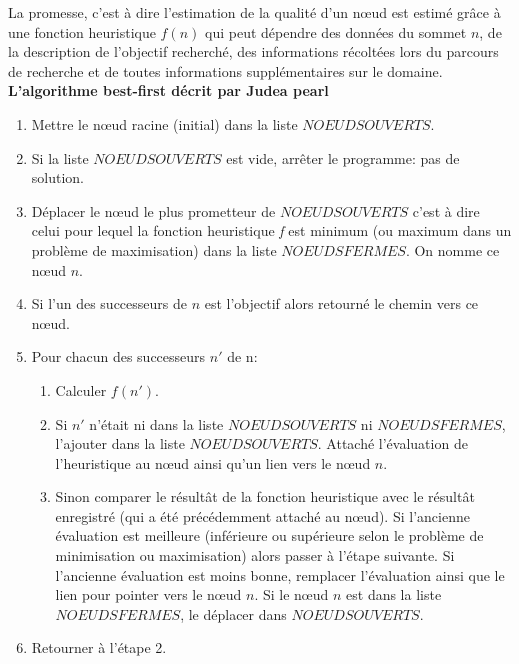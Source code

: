 La promesse, c'est à dire l'estimation de la qualité d'un nœud est estimé grâce à une fonction heuristique $f(n)$ qui peut dépendre des données du sommet $n$, de la description de l'objectif recherché, des informations récoltées lors du parcours de recherche et de toutes informations supplémentaires sur le domaine.\\




\textbf{L'algorithme best-first décrit par Judea pearl\cite{judea-pearl-heuristics}}
\begin{enumerate}
\item Mettre le nœud racine (initial) dans la liste $NOEUDS OUVERTS$.
\item Si la liste $NOEUDS OUVERTS$ est vide, arrêter le programme: pas de solution.
\item Déplacer le nœud le plus prometteur de $NOEUDS OUVERTS$ c'est à dire celui pour lequel la fonction heuristique \textit{f} est minimum (ou maximum dans un problème de maximisation) dans la liste $NOEUDS FERMES$. On nomme ce nœud $n$.
\item Si l'un des successeurs de $n$ est l'objectif alors retourné le chemin vers ce nœud.
\item Pour chacun des successeurs $n'$ de n:
    \begin{enumerate}
    \item Calculer $f(n')$.
    \item Si $n'$ n'était ni dans la liste $NOEUDS OUVERTS$ ni $NOEUDS FERMES$, l'ajouter dans la liste $NOEUDS OUVERTS$. Attaché l'évaluation de l'heuristique au nœud ainsi qu'un lien vers le nœud $n$.
    \item Sinon comparer le résultât de la fonction heuristique avec le résultât enregistré (qui a été précédemment attaché au nœud). Si l'ancienne évaluation est meilleure (inférieure ou supérieure selon le problème de minimisation ou maximisation) alors passer à l'étape suivante. Si l'ancienne évaluation est moins bonne, remplacer l'évaluation ainsi que le lien  pour pointer vers le nœud $n$. Si le nœud $n$ est dans la liste $NOEUDS FERMES$, le déplacer dans $NOEUDS OUVERTS$.
    \end{enumerate}
\item Retourner à l'étape 2.
\end{enumerate}

